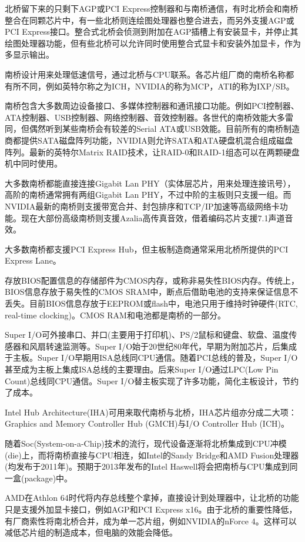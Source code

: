 北桥留下来的只剩下AGP或PCI Express控制器和与南桥通信，有时北桥会和南桥整合在同颗芯片中，有一些北桥则连绘图处理器也整合进去，而另外支援AGP或PCI Express接口。整合式北桥会侦测到附加在AGP插槽上有安装显卡，并停止其绘图处理器功能，但有些北桥可以允许同时使用整合式显卡和安装外加显卡，作为多显示输出。

南桥设计用来处理低速信号，通过北桥与CPU联系。各芯片组厂商的南桥名称都有所不同，例如英特尔称之为ICH，NVIDIA的称为MCP，ATI的称为IXP/SB。

南桥包含大多数周边设备接口、多媒体控制器和通讯接口功能。例如PCI控制器、ATA控制器、USB控制器、网络控制器、音效控制器。各世代的南桥效能大多雷同，但偶然听到某些南桥会有较差的Serial ATA或USB效能。目前所有的南桥制造商都提供SATA磁盘阵列功能，NVIDIA则允许SATA和ATA硬盘机混合组成磁盘阵列。最新的英特尔Matrix RAID技术，让RAID-0和RAID-1组态可以在两颗硬盘机中同时使用。

大多数南桥都能直接连接Gigabit Lan PHY（实体层芯片，用来处理连接讯号），高阶的南桥通常拥有两组Gigabit Lan PHY，不过中阶的主板则只支援一组。而NVIDIA最新的南桥则支援带宽合并、封包排序和TCP/IP加速等高级网络卡功能。现在大部份高级南桥则支援Azalia高传真音效，借着编码芯片支援7.1声道音效。

大多数南桥都支援PCI Express Hub，但主板制造商通常采用北桥所提供的PCI Express Lane。

存放BIOS配置信息的存储部件为CMOS内存，或称非易失性BIOS内存。传统上，BIOS信息存放于易失性的CMOS SRAM中，断点后借助电池的支持来保证信息不丢失。目前BIOS信息存放于EEPROM或flash中，电池只用于维持时钟硬件(RTC, real-time clocking)。CMOS RAM和电池都是南桥的一部分。

Super I/O可外接串口、并口(主要用于打印机)、PS/2鼠标和键盘、软盘、温度传感器和风扇转速监测等。Super I/O始于20世纪80年代，早期为附加芯片，后集成于主板。Super I/O早期用ISA总线同CPU通信。随着PCI总线的普及，Super I/O甚至成为主板上集成ISA总线的主要理由。后来Super I/O通过LPC(Low Pin Count)总线同CPU通信。Super I/O替主板实现了许多功能，简化主板设计，节约了成本。

Intel Hub Architecture(IHA)可用来取代南桥与北桥，IHA芯片组亦分成二大项：Graphics and Memory Controller Hub (GMCH)与I/O Controller Hub (ICH)。

随着Soc(System-on-a-Chip)技术的流行，现代设备逐渐将北桥集成到CPU冲模(die)上，而将南桥直接与CPU相连，如Intel的Sandy Bridge和AMD Fusion处理器(均发布于2011年)。预期于2013年发布的Intel Haswell将会把南桥与CPU集成到同一盒(package)中。

AMD在Athlon 64时代将内存总线整个拿掉，直接设计到处理器中，让北桥的功能只是支援外加显卡接口，例如AGP和PCI Express x16。由于北桥的重要性降低，有厂商索性将南北桥合并，成为单一芯片组，例如NVIDIA的nForce 4。这样可以减低芯片组的制造成本，但电脑的效能会降低。


